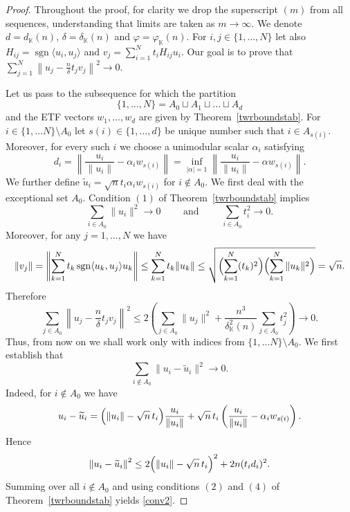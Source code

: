 \documentclass[12pt, reqno]{amsart}
\theoremstyle{definition}
\theoremstyle{remark}
\numberwithin{equation}{section}
\DeclareMathOperator{\sgn}{sgn}
\begin{document}
\begin{proof} Throughout the proof, for clarity we drop the superscript $(m)$ from all sequences, understanding that limits are taken as $m \to \infty$. We denote $d = d_{\mathbb{K}}(n)$, $\delta = \delta_{\mathbb{K}}(n)$ and $\varphi=\varphi_{\mathbb{K}}(n)$. For $i, j \in \{1, \ldots, N\}$ let also $H_{ij} = \sgn\langle u_i, u_j \rangle$ and  $v_j = \sum_{i=1}^N t_i H_{ij} u_i$. Our goal is to prove that $\sum_{j=1}^N \left \| u_j - \frac{n}{\delta} t_j v_j \right \|^2 \to 0$.

Let us pass to the subsequence for which the partition
$$ \{1,\ldots,N\} = A_0 \sqcup A_1 \sqcup \ldots \sqcup A_d $$ 
and the ETF vectors $ w_1,\ldots,w_d$ are given by Theorem~\ref{twrboundstab}. For $i \in \{1, \ldots N\} \setminus A_0$ let $s(i) \in \{1, \ldots, d\}$ be unique number such that $i \in A_{s(i)}$. Moreover, for every such $i$ we choose a unimodular scalar $\alpha_i$ satisfying 
$$ d_i = \left\| \frac{u_i}{\|u_i\|} - \alpha_iw_{s(i)} \right\| = \inf_{|\alpha|=1} \left\| \frac{u_i}{\|u_i\|} - \alpha w_{s(i)} \right\|. $$ 
We further define $\widetilde{u}_i = \sqrt{n} t_i \alpha_i w_{s(i)}$ for $i \notin A_0$. We first deal with the exceptional set $A_0$. Condition $(1)$ of Theorem~\ref{twrboundstab} implies
$$ \sum_{i\in A_0}\|u_i\|^2\to 0 \qquad \text{ and } \qquad \sum_{i\in A_0}t_i^2\to 0. $$ 
Moreover, for any $j=1, \ldots, N$ we have
$$\|v_j\|=\left\| \sum_{k=1}^{N} t_k \sgn \langle u_k,u_j\rangle u_k \right\| \leq \sum_{k=1}^{N} t_k\|u_k\| \leq \sqrt{\Bigl( \sum_{k=1}^{N} (t_k)^2 \Bigr) \Bigl( \sum_{k=1}^{N} \|u_k\|^2 \Bigr)} = \sqrt n.$$
Therefore 
$$ \sum_{j\in A_0}\left \|u_j - \frac{n}{\delta} t_j v_j \right \|^2 \leq 2 \left (\sum_{j \in A_0 }\|u_j\|^2 +  \frac{n^3}{\delta^2_{\mathbb K}(n)} \sum_{j \in A_0} t_j^2 \right ) \to 0. $$
Thus, from now on we shall work only with indices from $\{1, \ldots N\} \setminus A_0$. We first establish that 
\begin{equation}
\label{conv2}
\sum_{i \notin A_0} \|u_i - \widetilde{u}_i\|^2 \to 0.
\end{equation}
Indeed, for $i \notin A_0$ we have
$$ u_i - \widetilde{u}_i = \Bigl( \|u_i\| - \sqrt n\,t_i \Bigr) \frac{u_i}{\|u_i\|} + \sqrt n\,t_i \left( \frac{u_i}{\|u_i\|} - \alpha_iw_{s(i)} \right).$$
Hence 
$$\left\| u_i - \widetilde{u}_i \right\|^2 \leq 2 \Bigl( \|u_i\| - \sqrt n\,t_i \Bigr)^2 + 2n (t_id_i)^2.$$
Summing over all $i\notin A_0$ and using conditions $(2)$ and $(4)$ of Theorem~\ref{twrboundstab} yields \eqref{conv2}.


\end{proof}
\end{document}
